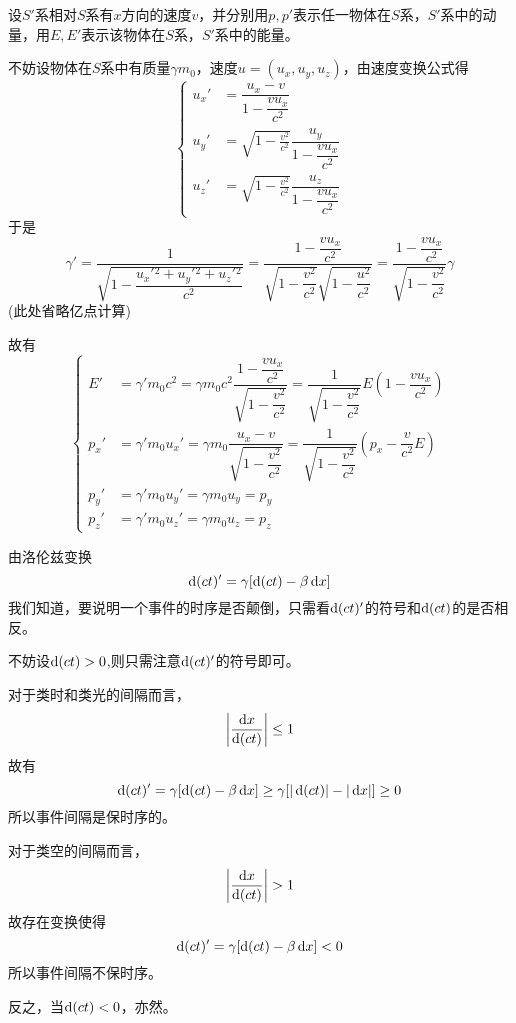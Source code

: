 \begin{prove}
	设$S'$系相对$S$系有$x$方向的速度$v$，并分别用$p,p'$表示任一物体在$S$系，$S'$系中的动量，用$E,E'$表示该物体在$S$系，$S'$系中的能量。
	
	不妨设物体在$S$系中有质量$\gamma m_0$，速度$u=(u_x,u_y,u_z)$，由速度变换公式得
	\[
	\left\{\begin{aligned}
		u_x'&=\dfrac{u_x-v}{1-\dfrac{vu_x}{c^2}}\\[1ex]
		u_y'&=\sqrt{1-\frac{v^2}{c^2}}\dfrac{u_y}{1-\dfrac{vu_x}{c^2}}\\[1ex]
		u_z'&=\sqrt{1-\frac{v^2}{c^2}}\dfrac{u_z}{1-\dfrac{vu_x}{c^2}}
	\end{aligned}\right.
	\]
	于是\[\gamma'=\dfrac{1}{\sqrt{1-\dfrac{u_x'{}^2+u_y'{}^2+u_z'{}^2}{c^2}}}=\dfrac{1-\dfrac{vu_x}{c^2}}{\sqrt{1-\dfrac{v^2}{c^2}}\sqrt{1-\dfrac{u^2}{c^2}}}=\dfrac{1-\dfrac{vu_x}{c^2}}{\sqrt{1-\dfrac{v^2}{c^2}}}\gamma\]
	(此处省略亿点计算)
	
	故有
	\[
	\left\{\begin{aligned}
		E'&=\gamma'm_0c^2=\gamma m_0c^2\dfrac{1-\dfrac{vu_x}{c^2}}{\sqrt{1-\dfrac{v^2}{c^2}}}=\dfrac{1}{\sqrt{1-\dfrac{v^2}{c^2}}}E(1-\dfrac{vu_x}{c^2})\\
		p_x'&=\gamma'm_0u_x'=\gamma m_0\dfrac{u_x-v}{\sqrt{1-\dfrac{v^2}{c^2}}}=\dfrac{1}{\sqrt{1-\dfrac{v^2}{c^2}}}(p_x-\dfrac{v}{c^2}E)\\
		p_y'&=\gamma'm_0u_y'=\gamma m_0u_y=p_y\\
		p_z'&=\gamma'm_0u_z'=\gamma m_0u_z=p_z
	\end{aligned}\right.
	\]
\end{prove}
\begin{prove}
    由洛伦兹变换
    \[\dif (ct)'=\gamma[\dif (ct)-\beta \dif x]\]
    我们知道，要说明一个事件的时序是否颠倒，只需看$\dif (ct)'$的符号和$\dif (ct)$的是否相反。
    
    不妨设$\dif (ct)>0$,则只需注意$\dif (ct)'$的符号即可。
    
    对于类时和类光的间隔而言，
    \[\left|\frac{\dif x}{\dif (ct)}\right|\le 1\]
    故有
    \[\dif (ct)'=\gamma[\dif (ct)-\beta \dif x] \ge \gamma[|\dif(ct)|-|\dif x|] \ge 0\]
    所以事件间隔是保时序的。
    
    对于类空的间隔而言，
    \[\left|\frac{\dif x}{\dif (ct)}\right|> 1\]
    故存在变换使得
    \[\dif (ct)'=\gamma[\dif (ct)-\beta \dif x] < 0\]
    所以事件间隔不保时序。
    
    反之，当$\dif(ct)<0$，亦然。
\end{prove}